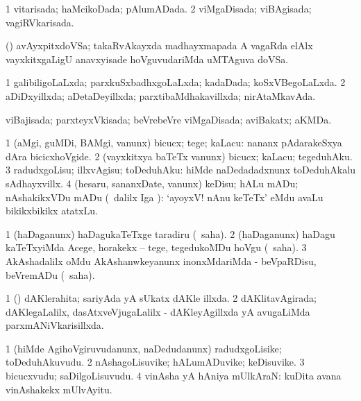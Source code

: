 {\bentry
{} 
\gl{\gu}
\expl{}
\bmng
\bnum
\num{1} vitarisada; haMcikoDada; pAlumADada. 
\num{2} viMgaDisada; viBAgisada; vagiRVkarisada. 
\enum
\emng

\noindent
\gl{\pagu}
\expl{}
\bmng
{} (\takaR) avAyxpitxdoVSa; takaRvAkayxda madhayxmapada A vagaRda elAlx vayxkitxgaLigU anavxyisade hoVguvudariMda uMTAguva doVSa. 
\emng
\eentry

\bentry
{} 
\gl{\gu}
\expl{}
\bmng
\bnum
\num{1} galibiligoLaLxda; parxkuSxbadhxgoLaLxda; kadaDada; koSxVBegoLaLxda. 
\num{2} aDiDxyillxda; aDetaDeyillxda; parxtibaMdhakavillxda; nirAtaMkavAda. 
\enum
\emng
\eentry

\bentry
{} 
\gl{\gu}
\expl{}
\bmng
 viBajisada; parxteyxVkisada; beVrebeVre viMgaDisada; aviBakatx; aKMDa. 
\emng
\eentry

\bentry
{} 
\gl{\akirx}
\bmng
\bnum
\num{1} (aMgi, guMDi, BAMgi, \mo vanunx) bicucx; tege; kaLacu:  nananx pAdarakeSxya dAra bicicxhoVgide. 
\num{2} (vayxkitxya baTeTx \mo vanunx) bicucx; kaLacu; tegeduhAku. 
\num{3} radudxgoLisu; illxvAgisu; toDeduhAku:  hiMde naDedadadxnunx toDeduhAkalu sAdhayxvillx. 
\num{4} (hesaru, sananxDate, \mo vanunx) keDisu; hALu mADu; nAshakikxVDu mADu (\kanmu\ \BUkaq dalilx Iga \viparx):  `ayoyxV! nAnu keTeTx' eMdu avaLu bikikxbikikx atatxLu. 
\enum
\emng
\eentry

\bentry
{} 
\gl{\sakirx}
\expl{}
\bmng
\bnum
\num{1} (haDaganunx) haDagukaTeTxge taradiru (\akirx\ saha). 
\num{2} (haDaganunx) haDagu kaTeTxyiMda Acege, horakekx -- tege, tegedukoMDu hoVgu (\akirx\ saha). 
\num{3} AkAshadalilx oMdu AkAshanwkeyanunx inonxMdariMda - beVpaRDisu, beVremADu (\akirx\ saha). 
\enum
\emng
\eentry

\bentry
{} 
\gl{\gu}
\expl{}
\bmng
\bnum
\num{1} (\ame) dAKlerahita; sariyAda yA sUkatx dAKle illxda. 
\num{2} dAKlitavAgirada; dAKlegaLalilx, dasAtxveVjugaLalilx - dAKleyAgillxda yA avugaLiMda parxmANiVkarisillxda. 
\enum
\emng
\eentry

\bentry
{} 
\gl{\nA}
\expl{}
\bmng
\bnum
\num{1} (hiMde AgihoVgiruvudanunx, naDedudanunx) radudxgoLisike; toDeduhAkuvudu. 
\num{2} nAshagoLisuvike; hALumADuvike; keDisuvike. 
\num{3} bicucxvudu; saDilgoLisuvudu. 
\num{4} vinAsha yA hAniya mUlkAraN:  kuDita avana vinAshakekx mUlvAyitu. 
\enum
\emng
\eentry

}
